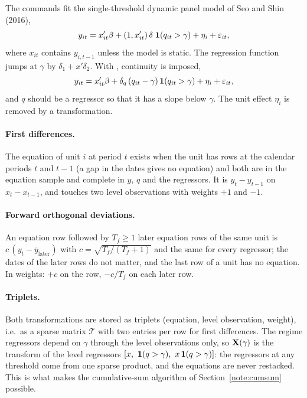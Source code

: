 \documentclass[
  10.5pt,
  a4paper,
]{article}
\begin{document}
The commands fit the single-threshold dynamic panel model of Seo and Shin (2016),
\begin{equation}\label{eq:jump}
y_{it}=x_{it}'\beta+(1,x_{it}')\,\delta\;\mathbf{1}(q_{it}>\gamma)+\eta_i+\varepsilon_{it},
\end{equation}
where $x_{it}$ contains $y_{i,t-1}$ unless the model is static. The regression function jumps at
$\gamma$ by $\delta_1+x'\delta_2$. With , continuity is imposed,
\begin{equation}\label{eq:kink}
y_{it}=x_{it}'\beta+\delta_q\,(q_{it}-\gamma)\,\mathbf{1}(q_{it}>\gamma)+\eta_i+\varepsilon_{it},
\end{equation}
and $q$ should be a regressor so that it has a slope below $\gamma$. The unit effect $\eta_i$ is
removed by a transformation.

\paragraph{First differences.} The equation of unit $i$ at period $t$ exists when the unit has rows
at the calendar periods $t$ and $t-1$ (a gap in the dates gives no equation) and both are in the
equation sample and complete in $y$, $q$ and the regressors. It is $y_t-y_{t-1}$ on
$x_t-x_{t-1}$, and touches two level observations with weights $+1$ and $-1$.

\paragraph{Forward orthogonal deviations.} An equation row followed by $T_f\ge1$ later equation rows of
the same unit is $c\,(y_t-\overline{y}_{\text{later}})$ with $c=\sqrt{T_f/(T_f+1)}$ and the same for
every regressor; the dates of the later rows do not matter, and the last row of a unit has no
equation. In weights: $+c$ on the row, $-c/T_f$ on each later row.

\paragraph{Triplets.} Both transformations are stored as triplets (equation, level observation,
weight), i.e.\ as a sparse matrix $\mathcal T$ with two entries per row for first differences. The
regime regressors depend on $\gamma$ through the level observations only, so $\mathbf{X}(\gamma)$ is the
transform of the level regressors $[x,\ \ind(q>\gamma),\ x\,\ind(q>\gamma)]$: the regressors at any
threshold come from one sparse product, and the equations are never restacked. This is what makes
the cumulative-sum algorithm of Section~\ref{note:cumsum} possible.
\end{document}
